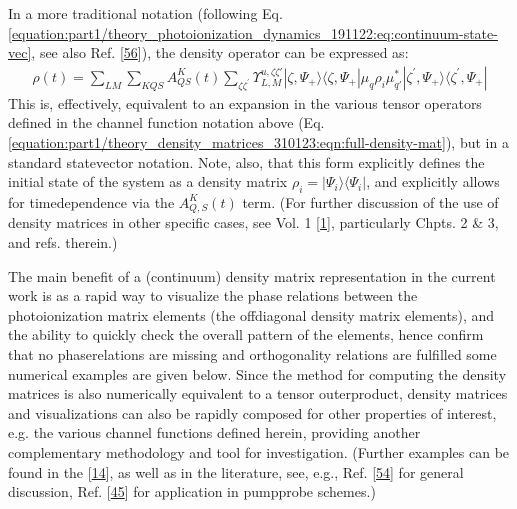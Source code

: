 \documentclass[letterpaper,table,10pt,english]{jupyterBook}
\begin{document}
\sphinxAtStartPar
In a more traditional notation (following Eq. \eqref{equation:part1/theory_photoionization_dynamics_191122:eq:continuum-state-vec}, see also Ref. {[}\hyperlink{cite.backmatter/bibliography:id576}{56}{]}), the density operator can be expressed as:
\begin{equation}\label{equation:part1/theory_density_matrices_310123:eqn:full-density-mat-traditional}
\begin{split}
\rho(t) =\sum_{LM}\sum_{KQS}A^{K}_{QS}(t)\sum_{\zeta\zeta^{\prime}}\varUpsilon_{L,M}^{u,\zeta\zeta'}|\zeta,\Psi_+\rangle\langle\zeta,\Psi_+|\mu_q\rho_i\mu_{q\prime}^{*}|\zeta^{\prime},\Psi_+\rangle\langle\zeta^{\prime},\Psi_+|
\end{split}
\end{equation}
\sphinxAtStartPar
This is, effectively, equivalent to an expansion in the various tensor operators defined in the channel function notation above (Eq. \eqref{equation:part1/theory_density_matrices_310123:eqn:full-density-mat}), but in a standard state\sphinxhyphen{}vector notation. Note, also, that this form explicitly defines the initial state of the system as a density matrix \(\rho_i = |\Psi_i\rangle\langle\Psi_i|\), and explicitly allows for time\sphinxhyphen{}dependence via the \(A_{Q,S}^{K}(t)\) term. (For further discussion of the use of density matrices in other specific cases, see  Vol. 1 {[}\hyperlink{cite.backmatter/bibliography:id613}{1}{]}, particularly Chpts. 2 \& 3, and refs. therein.)

\sphinxAtStartPar
The main benefit of a (continuum) density matrix representation in the current work is as a rapid way to visualize the phase relations between the photoionization matrix elements (the off\sphinxhyphen{}diagonal density matrix elements), and the ability to quickly check the overall pattern of the elements, hence confirm that no phase\sphinxhyphen{}relations are missing and orthogonality relations are fulfilled \sphinxhyphen{} some numerical examples are given below. Since the method for computing the density matrices is also numerically equivalent to a tensor outer\sphinxhyphen{}product, density matrices and visualizations can also be rapidly composed for other properties of interest, e.g. the various channel functions defined herein, providing another complementary methodology and tool for investigation. (Further examples can be found in the  {[}\hyperlink{cite.backmatter/bibliography:id545}{14}{]}, as well as in the literature, see, e.g., Ref. {[}\hyperlink{cite.backmatter/bibliography:id479}{54}{]} for general discussion, Ref. {[}\hyperlink{cite.backmatter/bibliography:id750}{45}{]} for application in pump\sphinxhyphen{}probe schemes.)
\end{document}
